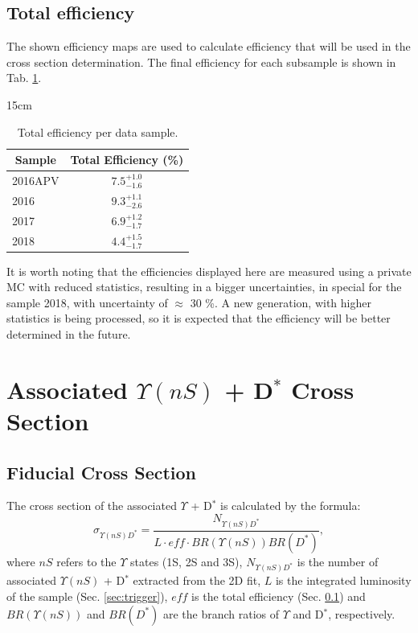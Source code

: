 \subsection{Total efficiency}\label{sec:total_eff}

The shown efficiency maps are used to calculate efficiency that will be used in the cross section determination. The final efficiency for each subsample is shown in Tab. \ref{tab:totaleff}.

\begin{table}[!htbp]{15cm}
  \caption{Total efficiency per data sample.}
  \begin{tabular}{ l | c }
    \hline
    \multicolumn{1}{c|}{Sample} & \multicolumn{1}{c}{Total Efficiency (\%)} \\ \hline
    2016APV & $7.5^{+1.0}_{-1.6}$ \\ \hline
    2016    & $9.3^{+1.1}_{-2.6}$ \\ \hline
    2017    & $6.9^{+1.2}_{-1.7}$ \\ \hline
    2018    & $4.4^{+1.5}_{-1.7}$ \\ \hline
  \end{tabular}
  \label{tab:totaleff}
\end{table}

It is worth noting that the efficiencies displayed here are measured using a private MC with reduced statistics, resulting in a bigger uncertainties, in special for the sample 2018, with uncertainty of $\approx$ 30 \%. A new generation, with higher statistics is being processed, so it is expected that the efficiency will be better determined in the future.

\section{Associated \texorpdfstring{$\Upsilon(nS)$ + D$^{*}$}{Y+D*} Cross Section}

\subsection{Fiducial Cross Section} \label{subsec:fiducial_xsec}

The cross section of the associated $\Upsilon$ + D$^{*}$ is calculated by the formula:
\begin{equation}
  \sigma_{\Upsilon(nS) D^*} = \frac{N_{\Upsilon(nS) D^*}}{L\cdot eff \cdot BR(\Upsilon(nS))BR(D^*)},
\end{equation}
where $nS$ refers to the $\Upsilon$ states (1S, 2S and 3S), $N_{\Upsilon(nS) D^*}$ is the number of associated $\Upsilon(nS)$ + D$^*$ extracted from the 2D fit, $L$ is the integrated luminosity of the sample (Sec. \ref{sec:trigger}), $eff$ is the total efficiency (Sec. \ref{sec:total_eff}) and $BR(\Upsilon(nS))$ and $BR(D^*)$ are the branch ratios of $\Upsilon$ and D$^*$, respectively.

